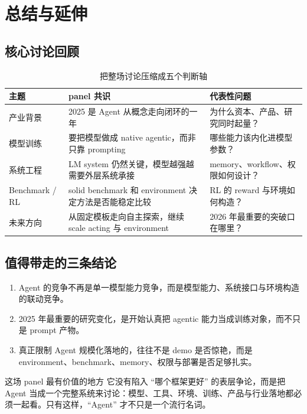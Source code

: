 \section{总结与延伸}

\subsection{核心讨论回顾}
\begin{table}[H]
\centering
\begin{tabular}{p{2.8cm}p{4.0cm}p{5.0cm}}
\toprule
\textbf{主题} & \textbf{panel 共识} & \textbf{代表性问题} \\
\midrule
产业背景 & 2025 是 Agent 从概念走向闭环的一年 & 为什么资本、产品、研究同时起量？ \\
模型训练 & 要把模型做成 native agentic，而非只靠 prompting & 哪些能力该内化进模型参数？ \\
系统工程 & LM system 仍然关键，模型越强越需要外层系统承接 & memory、workflow、权限如何设计？ \\
Benchmark / RL & solid benchmark 和 environment 决定方法是否能稳定比较 & RL 的 reward 与环境如何构造？ \\
未来方向 & 从固定模板走向自主探索，继续 scale acting 与 environment & 2026 年最重要的突破口在哪里？ \\
\bottomrule
\end{tabular}
\caption{把整场讨论压缩成五个判断轴}
\end{table}

\subsection{值得带走的三条结论}
\begin{enumerate}
  \item Agent 的竞争不再是单一模型能力竞争，而是模型能力、系统接口与环境构造的联动竞争。
  \item 2025 年最重要的研究变化，是开始认真把 agentic 能力当成训练对象，而不只是 prompt 产物。
  \item 真正限制 Agent 规模化落地的，往往不是 demo 是否惊艳，而是 environment、benchmark、memory、权限与部署是否足够扎实。
\end{enumerate}

\begin{importantbox}{这场 panel 最有价值的地方}
它没有陷入 ``哪个框架更好'' 的表层争论，而是把 Agent 当成一个完整系统来讨论：模型、工具、环境、训练、产品与行业落地都必须一起看。只有这样，``Agent'' 才不只是一个流行名词。
\end{importantbox}

